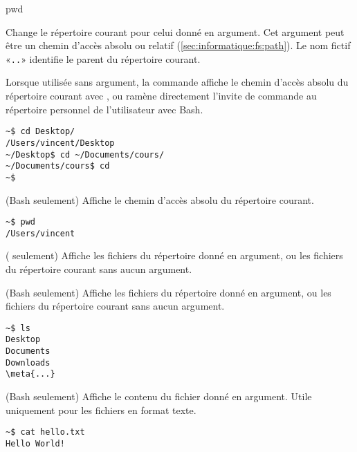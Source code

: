 \begin{ttscript}{pwd}
\item[\Icode{cd}] Change le répertoire courant pour
  celui donné en argument. Cet argument peut être un chemin d'accès
  absolu ou relatif (\autoref{sec:informatique:fs:path}). Le nom
  fictif «\verb=..=» identifie le parent du répertoire courant.

  Lorsque utilisée sans argument, la commande affiche le chemin
  d'accès absolu du répertoire courant avec , ou ramène
  directement l'invite de commande au répertoire personnel de
  l'utilisateur avec Bash.
  \begin{Schunk}
\begin{Verbatim}
~$ cd Desktop/
/Users/vincent/Desktop
~/Desktop$ cd ~/Documents/cours/
~/Documents/cours$ cd
~$
\end{Verbatim}
  \end{Schunk}
\item[\Icode{pwd}] (Bash seulement) Affiche le chemin
  d'accès absolu du répertoire courant.
  \begin{Schunk}
\begin{Verbatim}
~$ pwd
/Users/vincent
\end{Verbatim}
  \end{Schunk} %
\item[\Icode{dir}] (
  seulement) Affiche les fichiers du répertoire donné en argument, ou
  les fichiers du répertoire courant sans aucun argument.
\item[\code{ls}]  (Bash
  seulement) Affiche les fichiers du répertoire donné en argument, ou
  les fichiers du répertoire courant sans aucun argument.
  \begin{Schunk}
\begin{Verbatim}[commandchars=\\\{\},samepage=true]
~$ ls
Desktop
Documents
Downloads
\meta{...}
\end{Verbatim}
  \end{Schunk} %
\item[\Icode{cat}] (Bash seulement) Affiche le contenu du
  fichier donné en argument. Utile uniquement pour les fichiers en
  format texte.
  \begin{Schunk}
\begin{Verbatim}
~$ cat hello.txt
Hello World!
\end{Verbatim}
  \end{Schunk} %
\end{ttscript}

